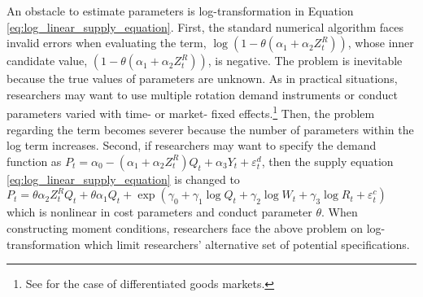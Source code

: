 \documentclass[11pt, a4paper]{article}
\begin{document}
An obstacle to estimate parameters is log-transformation in Equation \eqref{eq:log_linear_supply_equation}. First, the standard numerical algorithm faces invalid errors when evaluating the term, $\log (1 - \theta (\alpha_1 + \alpha_2 Z^{R}_{t}))$, whose inner candidate value, $(1 - \theta (\alpha_1 + \alpha_2 Z^{R}_{t}))$, is negative. The problem is inevitable because the true values of parameters are unknown. As in practical situations, researchers may want to use multiple rotation demand instruments or conduct parameters varied with time- or market- fixed effects.\footnote{See \cite{michel2018estimating} for the case of differentiated goods markets.} Then, the problem regarding the term becomes severer because the number of parameters within the log term increases. Second, if researchers may want to specify the demand function as $P_t=\alpha_0-\left(\alpha_1+\alpha_2 Z_t^R\right) Q_t+\alpha_3 Y_t+\varepsilon_t^d$, then the supply equation \eqref{eq:log_linear_supply_equation} is changed to $P_t=\theta \alpha_2 Z_t^R Q_t+\theta \alpha_1Q_t+\exp(\gamma_0+\gamma_1 \log Q_t+\gamma_2 \log W_t+\gamma_3 \log R_t+\varepsilon_t^c)$ which is nonlinear in cost parameters and conduct parameter $\theta$. When constructing moment conditions, researchers face the above problem on log-transformation which limit researchers' alternative set of potential specifications.

\end{document}
